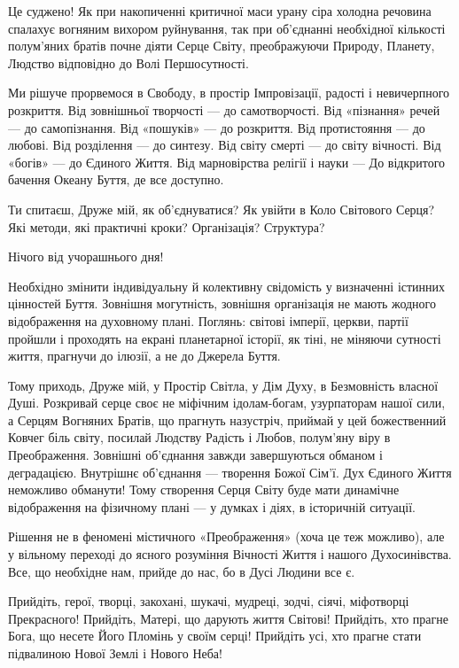 Це суджено! Як при накопиченні критичної маси урану сіра холодна речовина
спалахує вогняним вихором руйнування, так при об’єднанні необхідної кількості
полум’яних братів почне діяти Серце Світу, преображуючи Природу, Планету,
Людство відповідно до Волі Першосутності.

Ми рішуче прорвемося в Свободу, в простір Імпровізації, радості і невичерпного
розкриття. Від зовнішньої творчості — до самотворчості. Від «пізнання» речей —
до самопізнання. Від «пошуків» — до розкриття. Від протистояння — до любові.
Від розділення — до синтезу. Від світу смерті — до світу вічності. Від «богів»
— до Єдиного Життя. Від марновірства релігії і науки — До відкритого бачення
Океану Буття, де все доступно.

Ти спитаєш, Друже мій, як об’єднуватися? Як увійти в Коло Світового Серця? Які
методи, які практичні кроки? Організація? Структура?

Нічого від учорашнього дня!

Необхідно змінити індивідуальну й колективну свідомість у визначенні істинних
цінностей Буття. Зовнішня могутність, зовнішня організація не мають жодного
відображення на духовному плані. Поглянь: світові імперії, церкви, партії
пройшли і проходять на екрані планетарної історії, як тіні, не міняючи сутності
життя, прагнучи до ілюзії, а не до Джерела Буття.

Тому приходь, Друже мій, у Простір Світла, у Дім Духу, в Безмовність власної
Душі. Розкривай серце своє не міфічним ідолам-богам, узурпаторам нашої сили, а
Серцям Вогняних Братів, що прагнуть назустріч, приймай у цей божественний
Ковчег біль світу, посилай Людству Радість і Любов, полум’яну віру в
Преображення. Зовнішні об’єднання завжди завершуються обманом і деградацією.
Внутрішнє об’єднання — творення Божої Сім’ї. Дух Єдиного Життя неможливо
обманути! Тому створення Серця Світу буде мати динамічне відображення на
фізичному плані — у думках і діях, в історичній ситуації.

Рішення не в феномені містичного «Преображення» (хоча це теж можливо), але у
вільному переході до ясного розуміння Вічності Життя і нашого Духосинівства.
Все, що необхідне нам, прийде до нас, бо в Дусі Людини все є.

Прийдіть, герої, творці, закохані, шукачі, мудреці, зодчі, сіячі, міфотворці
Прекрасного! Прийдіть, Матері, що дарують життя Світові! Прийдіть, хто прагне
Бога, що несете Його Пломінь у своїм серці! Прийдіть усі, хто прагне стати
підвалиною Нової Землі і Нового Неба!


